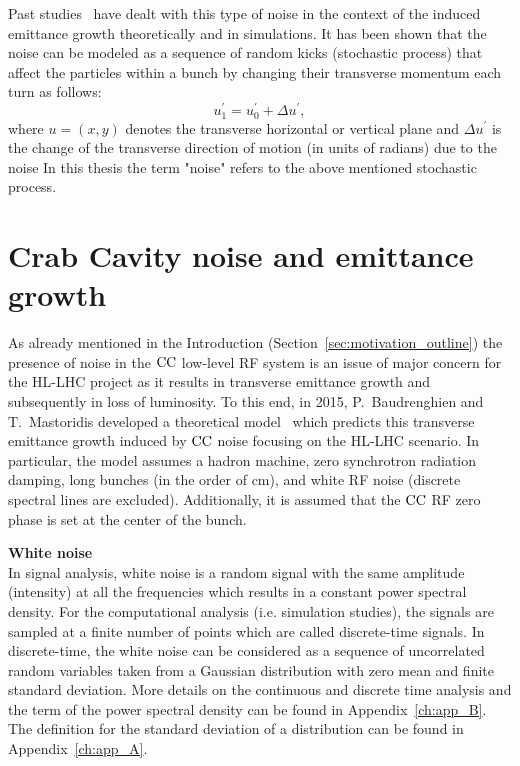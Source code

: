 Past studies~\cite{Lebedev:248620, Lebedev:248622, PhysRevSTAB.18.101001} have dealt with this type of noise in the context of the induced emittance growth theoretically and in simulations. It has been shown that the noise can be modeled as a sequence of random kicks (stochastic process) that affect the particles within a bunch by changing their transverse momentum each turn as follows:
\begin{equation}\label{eq:external_noise_kicks}
    u^\prime_1 =  u^\prime_0 + \Delta u^\prime,
\end{equation}
where $u=(x,y)$ denotes the transverse horizontal or vertical plane and $\Delta u^\prime$ is the change of the transverse direction of motion (in units of radians) due to the noise In this thesis the term "noise" refers to the above mentioned stochastic process.


\section{Crab Cavity noise and emittance growth}\label{eq:CC_noise_intro}
As already mentioned in the Introduction (Section~\ref{sec:motivation_outline}) the presence of noise in the ${\mathrm{CC}}$ low-level RF system is an issue of major concern for the HL-LHC project as it results in transverse emittance growth and subsequently in loss of luminosity. To this end, in 2015, P.~Baudrenghien and T.~Mastoridis developed a theoretical model~\cite{PhysRevSTAB.18.101001} which predicts this transverse emittance growth induced by ${\mathrm{CC}}$ noise focusing on the HL-LHC scenario. In particular, the model assumes a hadron machine, zero synchrotron radiation damping, long bunches (in the order of cm), and white RF noise (discrete spectral lines are excluded). Additionally, it is assumed that the ${\mathrm{CC}}$ RF zero phase is set at the center of the bunch.

\textbf{White noise}\\
In signal analysis, white noise is a random signal with the same amplitude (intensity) at all the frequencies which results in a constant power spectral density. For the computational analysis (i.e. simulation studies), the signals are sampled at a finite number of points which are called discrete-time signals. In discrete-time, the white noise can be considered as a sequence of uncorrelated random variables taken from a Gaussian distribution with zero mean and finite standard deviation. More details on the continuous and discrete time analysis and the term of the power spectral density can be found in Appendix~\ref{ch:app_B}. The definition for the standard deviation of a distribution can be found in Appendix~\ref{ch:app_A}.

